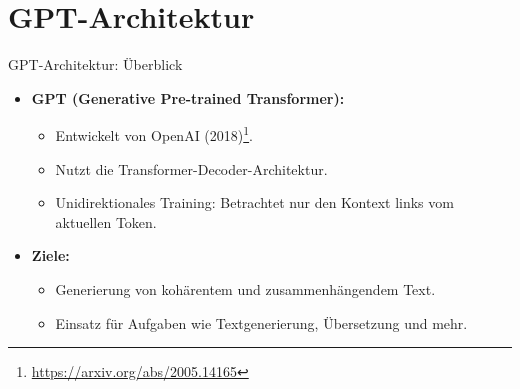 \documentclass[aspectratio=1610, xcolor=dvipsnames, 9pt]{beamer}
\begin{document}
\section{GPT-Architektur}

\begin{frame}{GPT-Architektur: Überblick}
  \begin{itemize}
    \item \textbf{GPT (Generative Pre-trained Transformer):}
      \begin{itemize}
        \item Entwickelt von OpenAI (2018)\footnote{\url{https://arxiv.org/abs/2005.14165}}.
        \item Nutzt die Transformer-Decoder-Architektur.
        \item Unidirektionales Training: Betrachtet nur den Kontext links vom aktuellen Token.
      \end{itemize}
    \item \textbf{Ziele:}
      \begin{itemize}
        \item Generierung von kohärentem und zusammenhängendem Text.
        \item Einsatz für Aufgaben wie Textgenerierung, Übersetzung und mehr.
      \end{itemize}
  \end{itemize}
\end{frame}
\end{document}
